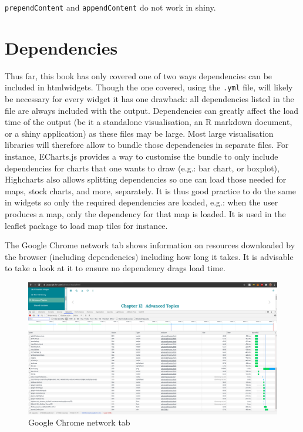 \documentclass[
]{krantz}
\makeatletter
\newenvironment{kframe}{%
\medskip{}
\setlength{\fboxsep}{.8em}
 \def\at@end@of@kframe{}%
 \ifinner\ifhmode%
  \def\at@end@of@kframe{\end{minipage}}%
  \begin{minipage}{\columnwidth}%
 \fi\fi%
 \def\FrameCommand##1{\hskip\@totalleftmargin \hskip-\fboxsep
 \colorbox{shadecolor}{##1}\hskip-\fboxsep
     \hskip-\linewidth \hskip-\@totalleftmargin \hskip\columnwidth}%
 \MakeFramed {\advance\hsize-\width
   \@totalleftmargin\z@ \linewidth\hsize
   \@setminipage}}%
 {\par\unskip\endMakeFramed%
 \at@end@of@kframe}
\newenvironment{rmdblock}[1]
  {
  \begin{itemize}
  \renewcommand{\labelitemi}{
    \raisebox{-.7\height}[0pt][0pt]{
      {\setkeys{Gin}{width=3em,keepaspectratio}\texttt{[image: images/\#1]}}
    }
  }
  \setlength{\fboxsep}{1em}
  \begin{kframe}
  \item
  }
  {
  \end{kframe}
  \end{itemize}
  }
\newenvironment{rmdnote}
  {\begin{rmdblock}{note}}
  {\end{rmdblock}}
\makeatother
\begin{document}
\begin{rmdnote}
\texttt{prependContent} and \texttt{appendContent} do not work in shiny.
\end{rmdnote}

\hypertarget{widgets-adv-dependencies}{%
\section{Dependencies}\label{widgets-adv-dependencies}}

Thus far, this book has only covered one of two ways dependencies can be included in htmlwidgets. Though the one covered, using the \texttt{.yml} file, will likely be necessary for every widget it has one drawback: all dependencies listed in the file are always included with the output. Dependencies can greatly affect the load time of the output (be it a standalone visualisation, an R markdown document, or a shiny application) as these files may be large. Most large visualisation libraries will therefore allow to bundle those dependencies in separate files. For instance, ECharts.js provides a way to customise the bundle to only include dependencies for charts that one wants to draw (e.g.: bar chart, or boxplot), Highcharts also allows splitting dependencies so one can load those needed for maps, stock charts, and more, separately. It is thus good practice to do the same in widgets so only the required dependencies are loaded, e.g.: when the user produces a map, only the dependency for that map is loaded. It is used in the leaflet package to load map tiles for instance.

The Google Chrome network tab shows information on resources downloaded by the browser (including dependencies) including how long it takes. It is advisable to take a look at it to ensure no dependency drags load time.

\begin{figure}
\centering
\includegraphics{images/htmlwidgets-performances.png}
\caption{Google Chrome network tab}
\end{figure}
\end{document}
